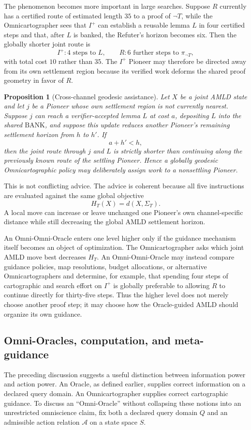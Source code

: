 \documentclass[11pt]{article}
\newtheorem{proposition}[theorem]{Proposition}
\newcommand{\BANK}{\mathrm{BANK}}
\begin{document}
The phenomenon becomes more important in large searches.  Suppose $R$ currently has a certified route of estimated length $35$ to a proof of $\neg T$, while the Omnicartographer sees that $I^+$ can establish a reusable lemma $L$ in four certified steps and that, after $L$ is banked, the Refuter's horizon becomes six.  Then the globally shorter joint route is
\[
I^+:4\text{ steps to }L,
\qquad
R:6\text{ further steps to }\pi_{\neg T},
\]
with total cost $10$ rather than $35$.  The $I^+$ Pioneer may therefore be directed away from its own settlement region because its verified work deforms the shared proof geometry in favor of $R$.

\begin{proposition}[Cross-channel geodesic assistance]
Let $X$ be a joint AMLD state and let $j$ be a Pioneer whose own settlement region is not currently nearest.  Suppose $j$ can reach a verifier-accepted lemma $L$ at cost $a$, depositing $L$ into the shared $\BANK$, and suppose this update reduces another Pioneer's remaining settlement horizon from $h$ to $h'$.  If
\[
a+h'<h,
\]
then the joint route through $j$ and $L$ is strictly shorter than continuing along the previously known route of the settling Pioneer.  Hence a globally geodesic Omnicartographic policy may deliberately assign work to a nonsettling Pioneer.
\end{proposition}

This is not conflicting advice.  The advice is coherent because all five instructions are evaluated against the same global objective
\[
H_T(X)=d(X,\Sigma_T).
\]
A local move can increase or leave unchanged one Pioneer's own channel-specific distance while still decreasing the global AMLD settlement horizon.

An Omni-Omni-Oracle enters one level higher only if the guidance mechanism itself becomes an object of optimization.  The Omnicartographer asks which joint AMLD move best decreases $H_T$.  An Omni-Omni-Oracle may instead compare guidance policies, map resolutions, budget allocations, or alternative Omnicartographers and determine, for example, that spending four steps of cartographic and search effort on $I^+$ is globally preferable to allowing $R$ to continue directly for thirty-five steps.  Thus the higher level does not merely choose another proof step; it may choose how the Oracle-guided AMLD should organize its own guidance.

\subsection{Omni-Oracles, computation, and meta-guidance}
The preceding discussion suggests a useful distinction between information power and action power.  An Oracle, as defined earlier, supplies correct information on a declared query domain.  An Omnicartographer supplies correct cartographic guidance.  To discuss an ``Omni-Oracle'' without collapsing these notions into an unrestricted omniscience claim, fix both a declared query domain $Q$ and an admissible action relation $\mathcal A$ on a state space $S$.
\end{document}

